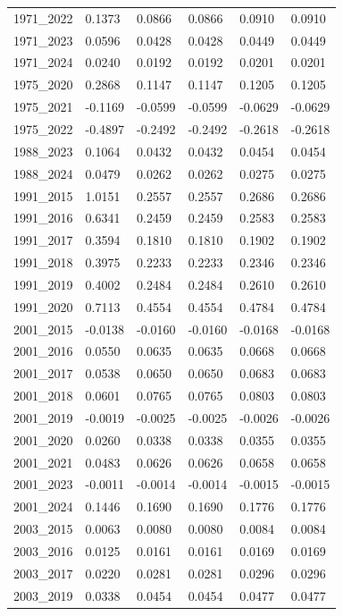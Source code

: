 \begin{table}[htbp]
\begin{tabular}{llllll}
1971_2022 & 0.1373 & 0.0866 & 0.0866 & 0.0910 & 0.0910 \\
1971_2023 & 0.0596 & 0.0428 & 0.0428 & 0.0449 & 0.0449 \\
1971_2024 & 0.0240 & 0.0192 & 0.0192 & 0.0201 & 0.0201 \\
1975_2020 & 0.2868 & 0.1147 & 0.1147 & 0.1205 & 0.1205 \\
1975_2021 & -0.1169 & -0.0599 & -0.0599 & -0.0629 & -0.0629 \\
1975_2022 & -0.4897 & -0.2492 & -0.2492 & -0.2618 & -0.2618 \\
1988_2023 & 0.1064 & 0.0432 & 0.0432 & 0.0454 & 0.0454 \\
1988_2024 & 0.0479 & 0.0262 & 0.0262 & 0.0275 & 0.0275 \\
1991_2015 & 1.0151 & 0.2557 & 0.2557 & 0.2686 & 0.2686 \\
1991_2016 & 0.6341 & 0.2459 & 0.2459 & 0.2583 & 0.2583 \\
1991_2017 & 0.3594 & 0.1810 & 0.1810 & 0.1902 & 0.1902 \\
1991_2018 & 0.3975 & 0.2233 & 0.2233 & 0.2346 & 0.2346 \\
1991_2019 & 0.4002 & 0.2484 & 0.2484 & 0.2610 & 0.2610 \\
1991_2020 & 0.7113 & 0.4554 & 0.4554 & 0.4784 & 0.4784 \\
2001_2015 & -0.0138 & -0.0160 & -0.0160 & -0.0168 & -0.0168 \\
2001_2016 & 0.0550 & 0.0635 & 0.0635 & 0.0668 & 0.0668 \\
2001_2017 & 0.0538 & 0.0650 & 0.0650 & 0.0683 & 0.0683 \\
2001_2018 & 0.0601 & 0.0765 & 0.0765 & 0.0803 & 0.0803 \\
2001_2019 & -0.0019 & -0.0025 & -0.0025 & -0.0026 & -0.0026 \\
2001_2020 & 0.0260 & 0.0338 & 0.0338 & 0.0355 & 0.0355 \\
2001_2021 & 0.0483 & 0.0626 & 0.0626 & 0.0658 & 0.0658 \\
2001_2023 & -0.0011 & -0.0014 & -0.0014 & -0.0015 & -0.0015 \\
2001_2024 & 0.1446 & 0.1690 & 0.1690 & 0.1776 & 0.1776 \\
2003_2015 & 0.0063 & 0.0080 & 0.0080 & 0.0084 & 0.0084 \\
2003_2016 & 0.0125 & 0.0161 & 0.0161 & 0.0169 & 0.0169 \\
2003_2017 & 0.0220 & 0.0281 & 0.0281 & 0.0296 & 0.0296 \\
2003_2019 & 0.0338 & 0.0454 & 0.0454 & 0.0477 & 0.0477 \\

\end{tabular}
\end{table}
